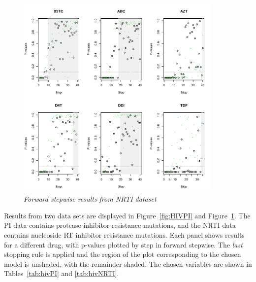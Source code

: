 \documentclass{imsart}
\begin{document}
\begin{figure}
\begin{center}
\includegraphics[width=0.9\textwidth]{../figs/HIV_NRTI.pdf}
\caption{\small \it Forward stepwise results from NRTI dataset}
\label{fig:HIVNRTI}
\end{center}
\end{figure}

Results from two data sets are displayed in Figure~\ref{fig:HIVPI} and
Figure~\ref{fig:HIVNRTI}. The PI data contains protease inhibitor
resistance mutations, and the NRTI data contains nucleoside RT inhibitor
resistance mutations.
Each panel shows results for a different drug,
with p-values plotted by step in forward stepwise. 
The \textit{last} stopping rule is applied and the region of the plot
corresponding to the chosen model is unshaded, with the remainder shaded.
The chosen variables are shown in Tables~\ref{tab:hivPI} and
\ref{tab:hivNRTI}.




\end{document}
